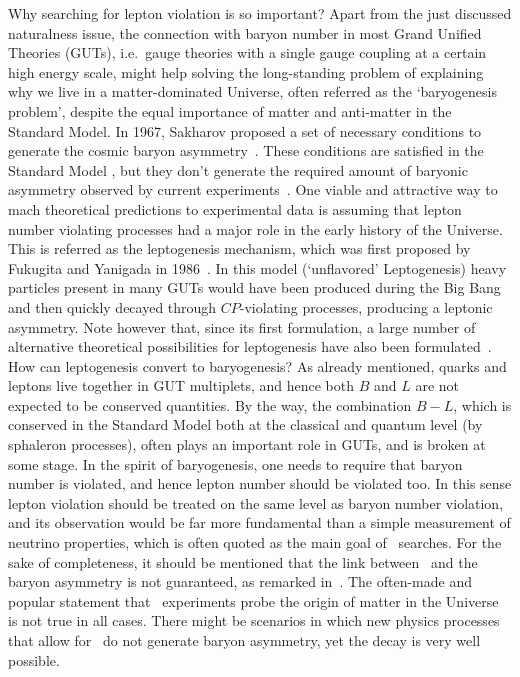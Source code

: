 Why searching for lepton violation is so important? Apart from the just discussed
naturalness issue, the connection with baryon number in most Grand Unified Theories
(GUTs), i.e.~gauge theories with a single gauge coupling at a certain high energy scale,
might help solving the long-standing problem of explaining why we live in a
matter-dominated Universe, often referred as the `baryogenesis problem', despite the equal
importance of matter and anti-matter in the Standard Model.  In 1967, Sakharov proposed a
set of necessary conditions to generate the cosmic baryon asymmetry~\cite{Sakharov1991}.
These conditions are satisfied in the Standard Model , but they don't generate the required
amount of baryonic asymmetry observed by current experiments~\cite{Zyla2020, Aghanim2018}.
One viable and attractive way to mach theoretical predictions to experimental data is
assuming that lepton number violating processes had a major role in the early history of
the Universe.  This is referred as the leptogenesis mechanism, which was first proposed by
Fukugita and Yanigada in 1986~\cite{Fukugita1986}. In this model (`unflavored'
Leptogenesis) heavy particles present in many GUTs would have been produced during the Big
Bang and then quickly decayed through $CP$-violating processes, producing a leptonic
asymmetry. Note however that, since its first formulation, a large number of alternative
theoretical possibilities for leptogenesis have also been formulated~\cite{?}.  How can
leptogenesis convert to baryogenesis? As already mentioned, quarks and leptons live
together in GUT multiplets, and hence both $B$ and $L$ are not expected to be conserved
quantities. By the way, the combination $B−L$, which is conserved in the Standard Model
both at the classical and quantum level (by sphaleron processes), often plays an important
role in GUTs, and is broken at some stage.  In the spirit of baryogenesis, one needs to
require that baryon number is violated, and hence lepton number should be violated too. In
this sense lepton violation should be treated on the same level as baryon number
violation, and its observation would be far more fundamental than a simple measurement of
neutrino properties, which is often quoted as the main goal of \onbb\ searches.  For the
sake of completeness, it should be mentioned that the link between \onbb\ and the baryon
asymmetry is not guaranteed, as remarked in~\cite{Rodejohann2011}. The often-made and
popular statement that \onbb\ experiments probe the origin of matter in the Universe is
not true in all cases. There might be scenarios in which new physics processes that allow
for \onbb\ do not generate baryon asymmetry, yet the decay is very well possible.

